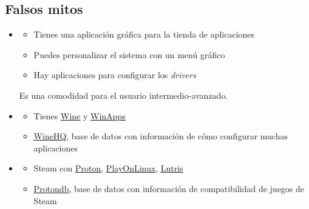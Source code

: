 \documentclass[aspectratio=43]{beamer}
\begin{document}
    \subsection{Falsos mitos}
    \begin{frame}[fragile]{\subsecname}{\secname}
        \begin{itemize}
            \item {}
            \pause
            \begin{itemize}
                \item Tienes una aplicación gráfica para la tienda de aplicaciones
                \item Puedes personalizar el sistema con un menú gráfico
                \item Hay aplicaciones para configurar los \textit{drivers}
            \end{itemize}
            Es una comodidad para el usuario intermedio-avanzado.
            \item {}
            \pause
            \begin{itemize}
                \item Tienes \href{https://www.winehq.org/}{\underline{Wine}} y \href{https://github.com/Fmstrat/winapps}{\underline{WinApps}}
                \item \href{https://appdb.winehq.org/}{\underline{WineHQ}}, base de datos con información de cómo configurar muchas aplicaciones
            \end{itemize}
            \item {}
            \pause
            \begin{itemize}
                \item Steam con \href{https://github.com/ValveSoftware/Proton}{\underline{Proton}}, \href{https://www.playonlinux.com/}{\underline{PlayOnLinux}}, \href{https://lutris.net/}{\underline{Lutris}}
                \item \href{https://www.protondb.com/}{\underline{Protondb}}, base de datos con información de compatibilidad de juegos de Steam
            \end{itemize}
        \end{itemize}
    \end{frame}

\end{document}
